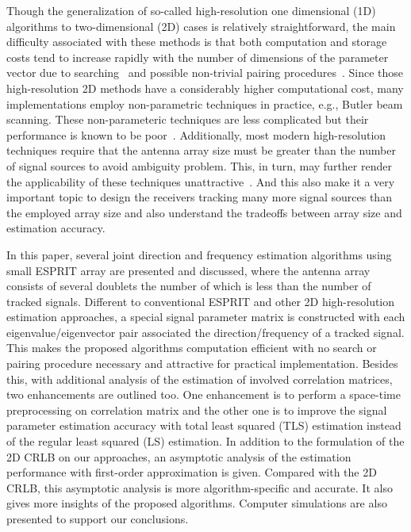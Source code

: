 \documentclass[a4paper,10pt,fleqn,twocolumn]{IEEEtran}
\begin{document}
Though the generalization of so-called high-resolution one
dimensional (1D) algorithms to two-dimensional (2D) cases is
relatively straightforward, the main difficulty associated with
these methods is that both computation and storage costs tend to
increase rapidly with the number of dimensions of the parameter
vector due to searching~\cite{Zolt96,Wong97,Bro98} and possible
non-trivial pairing procedures~\cite{Chen92,Veen92,Kedi96}. Since
those high-resolution 2D methods have a considerably higher
computational cost, many implementations employ non-parametric
techniques in practice, e.g., Butler beam scanning. These
non-parameteric techniques are less complicated but their
performance is known to be poor~\cite{Goda97}. Additionally, most
modern high-resolution techniques require that the antenna array
size must be greater than the number of signal sources to avoid
ambiguity problem. This, in turn, may further render the
applicability of these techniques unattractive~\cite{Wang98}. And
this also make it a very important topic to design the receivers
tracking many more signal sources than the employed array size and
also understand the tradeoffs between array size and estimation
accuracy.

In this paper, several joint direction and frequency estimation
algorithms using small ESPRIT array are presented and discussed,
where the antenna array consists of several doublets the number of
which is less than the number of tracked signals. Different to
conventional ESPRIT and other 2D high-resolution estimation
approaches, a special signal parameter matrix is constructed with
each eigenvalue/eigenvector pair associated the
direction/frequency of a tracked signal. This makes the proposed
algorithms computation efficient with no search or pairing
procedure necessary and attractive for practical implementation.
Besides this, with additional analysis of the estimation of
involved correlation matrices, two enhancements are outlined too.
One enhancement is to perform a space-time preprocessing on
correlation matrix and the other one is to improve the signal
parameter estimation accuracy with total least squared (TLS)
estimation instead of the regular least squared (LS) estimation.
In addition to the formulation of the 2D CRLB on our approaches,
an asymptotic analysis of the estimation performance with
first-order approximation is given. Compared with the 2D CRLB,
this asymptotic analysis is more algorithm-specific and accurate.
It also gives more insights of the proposed algorithms. Computer
simulations are also presented to support our conclusions.
\end{document}
